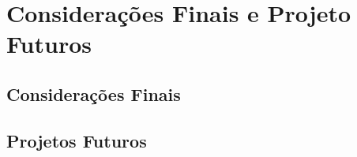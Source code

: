 \chapter{Considerações Finais e Projeto Futuros}

\section{Considerações Finais}

\section{Projetos Futuros}